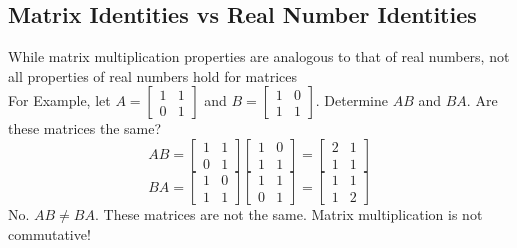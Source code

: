 \subsection{Matrix Identities vs Real Number Identities}
While matrix multiplication properties are analogous to that of real numbers,
not all properties of real numbers hold for matrices 
\\[8pt]
For Example, let $A = \begin{bmatrix}
  1 & 1 \\
  0 & 1
\end{bmatrix}$ and $B = \begin{bmatrix}
  1 & 0 \\
  1 & 1
\end{bmatrix}$. Determine $AB$ and $BA$. Are these matrices the same?
\\[8pt]
\[
  AB = \begin{bmatrix}
    1 & 1 \\
    0 & 1
  \end{bmatrix} \begin{bmatrix}
    1 & 0 \\
    1 & 1
  \end{bmatrix} = \begin{bmatrix}
    2 & 1 \\
    1 & 1
  \end{bmatrix}
\]
\[
  BA = \begin{bmatrix}
    1 & 0 \\
    1 & 1
  \end{bmatrix} \begin{bmatrix}
    1 & 1 \\
    0 & 1
  \end{bmatrix} = \begin{bmatrix}
    1 & 1 \\
    1 & 2
  \end{bmatrix}
\]
No. $AB \neq BA$. These matrices are not the same. Matrix multiplication is not
commutative!
